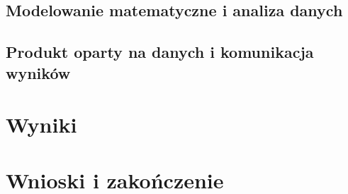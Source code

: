\documentclass[12pt, a4paper]{article}
\begin{document}


\subsection{Modelowanie matematyczne i analiza danych}
\subsection{Produkt oparty na danych i komunikacja wyników}

\section{Wyniki}

\section{Wnioski i zakończenie}




\end{document}
